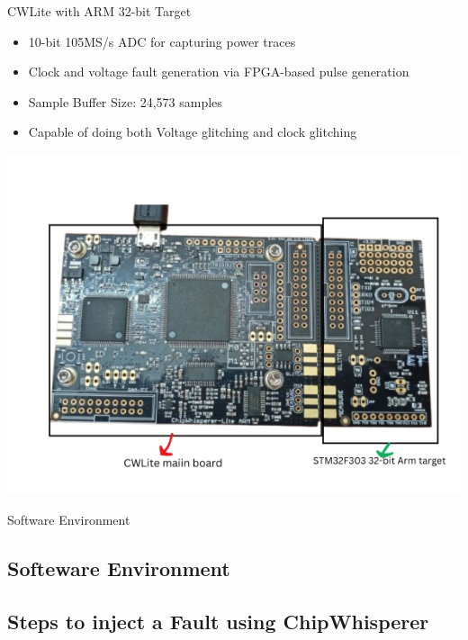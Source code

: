 \documentclass{beamer}
\newenvironment{tres important}[2][]{
	\setkeys{EmphEqEnv}{#2}
	\setkeys{EmphEqOpt}{box={\setlength{\fboxsep}{10pt}\fcolorbox{myNewColorA}{white}},#1}
	\EmphEqMainEnv}
{\endEmphEqMainEnv}
\begin{document}
\begin{frame}[fragile]{CWLite with ARM 32-bit Target}
  \centering
  \begin{itemize}
    \item 10-bit 105MS/s ADC for capturing power traces
    \item Clock and voltage fault generation via FPGA-based pulse generation
    \item Sample Buffer Size:	24,573 samples
    \item Capable of doing both Voltage glitching and clock glitching
  \end{itemize}
  \includegraphics[width=0.6\linewidth]{images/cwlite.png}
  \smallskip

  

\end{frame}

\begin{frame}{Software Environment}
  
  
\end{frame}
\subsection{Softeware Environment}
\subsection{Steps to inject a Fault using ChipWhisperer}
\end{document}
